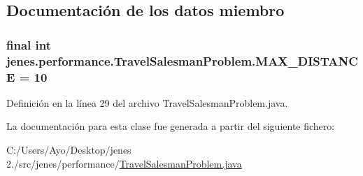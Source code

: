 \subsection{Documentación de los datos miembro}
\hypertarget{classjenes_1_1performance_1_1_travel_salesman_problem_aceff750d55c6086531bf25b73289ac4e}{
\subsubsection[{M\-A\-X\-\_\-\-D\-I\-S\-T\-A\-N\-C\-E}]{\setlength{\rightskip}{0pt plus 5cm}final int jenes.\-performance.\-Travel\-Salesman\-Problem.\-M\-A\-X\-\_\-\-D\-I\-S\-T\-A\-N\-C\-E = 10\hspace{0.3cm}{\ttfamily [static]}}}\label{classjenes_1_1performance_1_1_travel_salesman_problem_aceff750d55c6086531bf25b73289ac4e}


Definición en la línea 29 del archivo Travel\-Salesman\-Problem.\-java.



La documentación para esta clase fue generada a partir del siguiente fichero\-:\begin{DoxyCompactItemize}
\item 
C\-:/\-Users/\-Ayo/\-Desktop/jenes 2./src/jenes/performance/\hyperlink{performance_2_travel_salesman_problem_8java}{Travel\-Salesman\-Problem.\-java}\end{DoxyCompactItemize}
